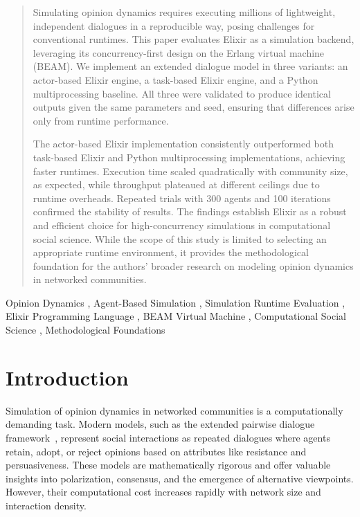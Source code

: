 \documentclass[
]{ceurart}
\begin{document}
\begin{abstract}
Simulating opinion dynamics requires executing millions of lightweight, independent dialogues in a reproducible way, posing challenges for conventional runtimes. This paper evaluates Elixir as a simulation backend, leveraging its concurrency-first design on the Erlang virtual machine (BEAM). We implement an extended dialogue model in three variants: an actor-based Elixir engine, a task-based Elixir engine, and a Python multiprocessing baseline. All three were validated to produce identical outputs given the same parameters and seed, ensuring that differences arise only from runtime performance.

The actor-based Elixir implementation consistently outperformed both task-based Elixir and Python multiprocessing implementations, achieving faster runtimes. Execution time scaled quadratically with community size, as expected, while throughput plateaued at different ceilings due to runtime overheads. Repeated trials with 300 agents and 100 iterations confirmed the stability of results. The findings establish Elixir as a robust and efficient choice for high-concurrency simulations in computational social science. While the scope of this study is limited to selecting an appropriate runtime environment, it provides the methodological foundation for the authors’ broader research on modeling opinion dynamics in networked communities.

\end{abstract}

\begin{keywords}
Opinion Dynamics \sep{} 
Agent-Based Simulation \sep{}
Simulation Runtime Evaluation \sep{} 
Elixir Programming Language \sep{} 
BEAM Virtual Machine \sep{} 
Computational Social Science \sep{} 
Methodological Foundations
\end{keywords}

\maketitle

\section{Introduction}
Simulation of opinion dynamics in networked communities is a computationally demanding task. Modern models, such as the extended pairwise dialogue framework~\cite{Lytvynenko2025}, represent social interactions as repeated dialogues where agents retain, adopt, or reject opinions based on attributes like resistance and persuasiveness. These models are mathematically rigorous and offer valuable insights into polarization, consensus, and the emergence of alternative viewpoints. However, their computational cost increases rapidly with network size and interaction density.
\end{document}
